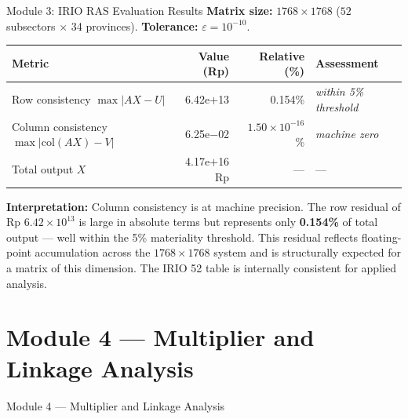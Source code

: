 \documentclass[aspectratio=169]{beamer}
\begin{document}
\begin{frame}{Module 3: IRIO RAS Evaluation Results}
\textbf{Matrix size:} $1768 \times 1768$ ($52$ subsectors $\times$ 34 provinces). \textbf{Tolerance:} $\varepsilon = 10^{-10}$.

\medskip
\begin{center}
\renewcommand{\arraystretch}{1.3}
\footnotesize
\begin{tabular}{@{}p{5.2cm}rrl@{}}
\toprule
\textbf{Metric} & \textbf{Value (Rp)} & \textbf{Relative (\%)} & \textbf{Assessment} \\
\midrule
Row consistency $\max|AX - U|$              & 6.42e$+$13    & 0.154\%                & \textit{within 5\% threshold} \\
Column consistency $\max|\text{col}(AX)-V|$ & 6.25e$-$02    & $1.50\times10^{-16}$\% & \textit{machine zero} \\
Total output $X$                            & 4.17e$+$16 Rp & ---                    & --- \\
\bottomrule
\end{tabular}
\end{center}

\medskip
\small
\textbf{Interpretation:} Column consistency is at machine precision. The row residual of Rp $6.42 \times 10^{13}$ is large in absolute terms but represents only \textbf{0.154\%} of total output --- well within the 5\% materiality threshold. This residual reflects floating-point accumulation across the $1768 \times 1768$ system and is structurally expected for a matrix of this dimension. The IRIO 52 table is internally consistent for applied analysis.
\end{frame}

\section{Module 4 --- Multiplier and Linkage Analysis}

\begin{frame}{Module 4 --- Multiplier and Linkage Analysis}
\tableofcontents[currentsection]
\end{frame}
\end{document}
